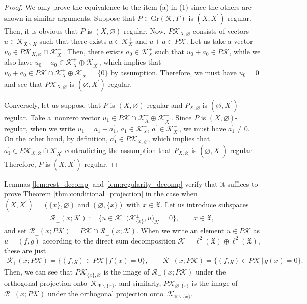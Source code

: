 \documentclass[pdftex]{sigma}
\numberwithin{equation}{section}
\newcommand{\pr}[1]{#1^{\prime}}
\newcommand{\mfrak}[1]{\mathfrak{#1}}
\newcommand{\mcal}[1]{\mathcal{#1}}
\newcommand{\mrm}[1]{\mathrm{#1}}
\begin{document}
\begin{proof}
We only prove the equivalence to the item (a) in (1) since the others are shown in similar arguments.
Suppose that $P\in \mrm{Gr}(\mcal{K},\Gamma)$ is $(X,\pr{X})$-regular. Then, it is obvious that $P$ is $(X,\varnothing)$-regular. Now, $P\mcal{K}_{X,\varnothing}$ consists of vectors $u\in\mcal{K}_{\mfrak{X}\backslash X}$ such that there exists $a\in \mcal{K}_{X}^{+}$ and $u+a\in P\mcal{K}$. Let us take a vector $u_{0}\in P\mcal{K}_{X,\varnothing}\cap \mcal{K}_{\pr{X}}^{-}$. Then, there exists $a_{0}\in \mcal{K}_{X}^{+}$ such that $u_{0}+a_{0}\in P\mcal{K}$, while we also have $u_{0}+a_{0}\in \mcal{K}_{X}^{+}\oplus \mcal{K}_{\pr{X}}^{-}$, which implies that $u_{0}+a_{0}\in P\mcal{K}\cap \mcal{K}_{X}^{+}\oplus \mcal{K}_{\pr{X}}^{-}=\{0\}$ by assumption. Therefore, we must have $u_{0}=0$ and see that $P\mcal{K}_{X,\varnothing}$ is $(\varnothing,\pr{X})$-regular.

Conversely, let us suppose that $P$ is $(X,\varnothing)$-regular and $P_{X,\varnothing}$ is $(\varnothing,\pr{X})$-regular. Take a~nonzero vector $u_{1}\in P\mcal{K}\cap \mcal{K}_{X}^{+}\oplus \mcal{K}_{\pr{X}}^{-}$. Since $P$ is $(X,\varnothing)$-regular, when we write $u_{1}=a_{1}+\pr{a}_{1}$, $a_{1}\in \mcal{K}_{X}^{+}$, $\pr{a}\in \mcal{K}_{\pr{X}}^{-}$, we must have $\pr{a}_{1}\neq 0$. On the other hand, by definition, $\pr{a}_{1}\in P\mcal{K}_{X,\varnothing}$, which implies that $\pr{a}_{1}\in P\mcal{K}_{X,\varnothing}\cap \mcal{K}_{\pr{X}}^{-}$ contradicting the assumption that $P_{X,\varnothing}$ is $(\varnothing,\pr{X})$-regular. Therefore, $P$ is $(X,\pr{X})$-regular.
\end{proof}

Lemmas \ref{lem:rest_decomp} and \ref{lem:regularity_decomp} verify that it suffices to prove Theorem \ref{thm:conditional_projection} in the case when $(X,\pr{X})=(\{x\},\varnothing)$ and $(\varnothing,\{x\})$ with $x\in\mfrak{X}$.
Let us introduce subspaces
\begin{gather*}
	\mcal{R}_{\pm}(x;\mcal{K}):=\big\{u\in \mcal{K}\,|\, \big(\mcal{K}^{\pm}_{\{x\}},u\big)_{\mcal{K}}=0\big\},\qquad x\in \mfrak{X},
\end{gather*}
and set $\mcal{R}_{\pm}(x;P\mcal{K})=P\mcal{K}\cap \mcal{R}_{\pm}(x;\mcal{K})$.
When we write an element $u\in P\mcal{K}$ as $u=(f,g)$ according to the direct sum decomposition $\mcal{K}=\ell^{2}(\mfrak{X})\oplus \ell^{2}(\mfrak{X})$, these are just
\begin{gather*}
	\mcal{R}_{+}(x;P\mcal{K}) =\{(f,g)\in P\mcal{K}\,|\,f(x)=0\}, \qquad \mcal{R}_{-}(x;P\mcal{K}) =\{(f,g)\in P\mcal{K}\,|\,g(x)=0\}.
\end{gather*}
Then, we can see that $P\mcal{K}_{\{x\},\varnothing}$ is the image of $\mcal{R}_{-}(x;P\mcal{K})$ under the orthogonal projection onto~$\mcal{K}_{\mfrak{X}\backslash\{x\}}$, and similarly, $P\mcal{K}_{\varnothing,\{x\}}$ is the image of $\mcal{R}_{+}(x;P\mcal{K})$ under the orthogonal projection onto~$\mcal{K}_{\mfrak{X}\backslash\{x\}}$.
\end{document}
